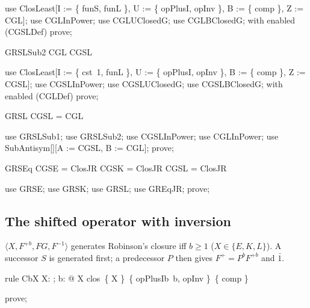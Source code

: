 \documentclass{article}
\begin{document}
\begin{zproof}
use ClosLeast[I := \{ funS, funL \}, U := \{ opPlusI, opInv \}, B := \{ comp \}, Z := CGL];
use CGLInPower;
use CGLUClosedG;
use CGLBClosedG;
with enabled (CGSLDef) prove;
\end{zproof}

\begin{theorem}{GRSLSub2}
  CGL \subseteq CGSL
\end{theorem}

\begin{zproof}
use ClosLeast[I := \{ cst~1, funL \}, U := \{ opPlusI, opInv \}, B := \{ comp \}, Z := CGSL];
use CGSLInPower;
use CGSLUClosedG;
use CGSLBClosedG;
with enabled (CGLDef) prove;
\end{zproof}

\begin{theorem}{GRSL}
  CGSL = CGL
\end{theorem}

\begin{zproof}
use GRSLSub1;
use GRSLSub2;
use CGSLInPower;
use CGLInPower;
use SubAntisym[\nat \fun \nat][A := CGSL, B := CGL];
prove;
\end{zproof}


\begin{theorem}{GRSEq}
  CGSE = ClosJR \land CGSK = ClosJR \land CGSL = ClosJR
\end{theorem}

\begin{zproof}
use GRSE;
use GRSK;
use GRSL;
use GREqJR;
prove;
\end{zproof}

\subsection{The shifted operator with inversion}

$\langle X, F^{+b}, FG, F^{-1}\rangle$ generates Robinson's closure iff $b \geq 1$
($X \in \{E, K, L\}$).  A successor $S$ is generated first; a predecessor $P$ then gives
$F^+ = P^b F^{+b}$ and $\bar 1$.

\begin{theorem}{rule CbX}
  \forall X: \nat \fun \nat; b: \nat @ X \in clos~\{ X \}~\{ opPlusIb~b, opInv \}~\{ comp \}
\end{theorem}

\begin{zproof}
prove;
\end{zproof}

\end{document}
